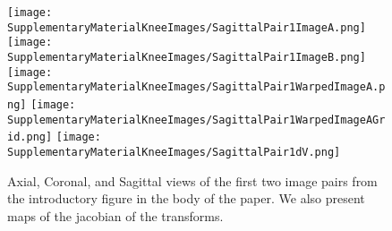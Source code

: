 \begin{figure}
    \texttt{[image: SupplementaryMaterialKneeImages/SagittalPair1ImageA.png]}
    \texttt{[image: SupplementaryMaterialKneeImages/SagittalPair1ImageB.png]}
    \texttt{[image: SupplementaryMaterialKneeImages/SagittalPair1WarpedImageA.png]}
    \texttt{[image: SupplementaryMaterialKneeImages/SagittalPair1WarpedImageAGrid.png]}
    \texttt{[image: SupplementaryMaterialKneeImages/SagittalPair1dV.png]}\\
    \caption{Axial, Coronal, and Sagittal views of the first two image pairs from the introductory figure in the body of the paper. We also present maps of the jacobian of the transforms.}
    \label{fig:my_label}
\end{figure}
\fi


